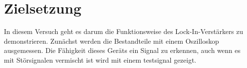 \section{Zielsetzung}
In diesem Versuch geht es darum die Funktionsweise des Lock-In-Verstärkers zu demonstrieren.
Zunächst werden die Bestandteile mit einem Oszilloskop ausgemessen.
Die Fähigkeit dieses Geräts ein Signal zu erkennen, auch wenn es mit Störsignalen vermischt ist wird mit einem testsignal gezeigt.
